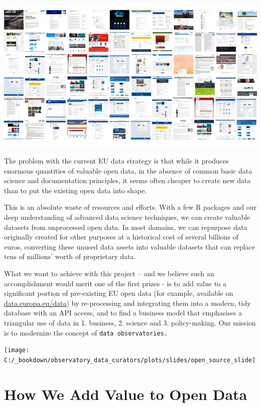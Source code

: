 \documentclass[
  a4paper,
  openany, a4paper, oneside]{book}
\begin{document}
\begin{center}\includegraphics[width=11.11in]{plots/screenshots/observatory_collage_16x9_800} \end{center}

The problem with the current EU data strategy is that while it produces enormous quantities of valuable open data, in the absence of common basic data science and documentation principles, it seems often cheaper to create new data than to put the existing open data into shape.

This is an absolute waste of resources and efforts. With a few R packages and our deep understanding of advanced data science techniques, we can create valuable datasets from unprocessed open data. In most domains, we can repurpose data originally created for other purposes at a historical cost of several billions of euros, converting these unused data assets into valuable datasets that can replace tens of millions' worth of proprietary data.

What we want to achieve with this project -- and we believe such an accomplishment would merit one of the first prizes - is to add value to a significant portion of pre-existing EU open data (for example, available on \href{https://data.europa.eu/data/}{data.europa.eu/data}) by re-processing and integrating them into a modern, tidy database with an API access, and to find a business model that emphasises a triangular use of data in 1. business, 2. science and 3. policy-making. Our mission is to modernize the concept of \texttt{data\ observatories.}

\begin{center}\texttt{[image: C:/\_bookdown/observatory\_data\_curators/plots/slides/open\_source\_slide]} \end{center}

\hypertarget{add-value-open-data}{%
\section{How We Add Value to Open Data}\label{add-value-open-data}}
\end{document}
